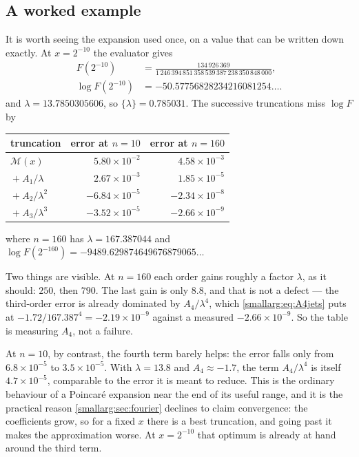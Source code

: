 \documentclass[11pt,oneside]{article}
\theoremstyle{definition}
\theoremstyle{remark}
\begin{document}
\subsection{A worked example}\label{smallarg:sec:worked}

It is worth seeing the expansion used once, on a value that can be written
down exactly.  At $x=2^{-10}$ the evaluator gives
\[
\begin{aligned}
  F(2^{-10})
    &=\frac{134\,926\,369}
      {1\,246\,394\,851\,358\,539\,387\,238\,350\,848\,000},\\
  \log F(2^{-10})&=-50.57756828234216081254\dots .
\end{aligned}
\]
and $\lambda=13.7850305606$, so $\{\lambda\}=0.785031$.  The successive
truncations miss $\log F$ by

\begin{center}\small
\begin{tabular}{@{}lrr@{}}
\toprule
truncation & error at $n=10$ & error at $n=160$\\
\midrule
$\mathcal M(x)$ & $5.80\times10^{-2}$ & $4.58\times10^{-3}$\\
${}+A_1/\lambda$ & $2.67\times10^{-3}$ & $1.85\times10^{-5}$\\
${}+A_2/\lambda^2$ & $-6.84\times10^{-5}$ & $-2.34\times10^{-8}$\\
${}+A_3/\lambda^3$ & $-3.52\times10^{-5}$ & $-2.66\times10^{-9}$\\
\bottomrule
\end{tabular}
\end{center}

where $n=160$ has $\lambda=167.387044$ and
$\log F(2^{-160})=-9489.629874649676879065\dots$

Two things are visible.  At $n=160$ each order gains roughly a factor
$\lambda$, as it should: $250$, then $790$.  The last gain is only $8.8$,
and that is not a defect --- the third-order error is already dominated by
$A_4/\lambda^4$, which \cref{smallarg:eq:A4jets} puts at
$-1.72/167.387^4=-2.19\times10^{-9}$ against a measured
$-2.66\times10^{-9}$.  So the table is measuring $A_4$, not a failure.

At $n=10$, by contrast, the fourth term barely helps: the error falls only
from $6.8\times10^{-5}$ to $3.5\times10^{-5}$.  With $\lambda=13.8$ and
$A_4\approx-1.7$, the term $A_4/\lambda^4$ is itself $4.7\times10^{-5}$,
comparable to the error it is meant to reduce.  This is the ordinary
behaviour of a Poincar\'e expansion near the end of its useful range, and it
is the practical reason \cref{smallarg:sec:fourier} declines to claim convergence:
the coefficients grow, so for a fixed $x$ there is a best truncation, and
going past it makes the approximation worse.  At $x=2^{-10}$ that optimum is
already at hand around the third term.
\end{document}
